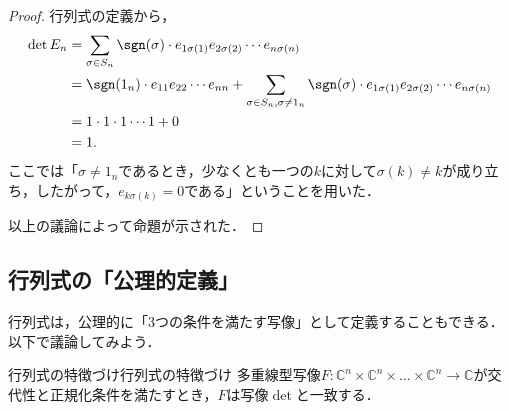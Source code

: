 \begin{tleftbar}
\begin{proof}
  行列式の定義から，
  \begin{align*} 
    \det E_n &= \sum_{\sigma \in S_n} \sgn(\sigma) \cdot e_{1\sigma(1)} e_{2\sigma(2)} \dotsm e_{n\sigma(n)} \\
    &= \sgn(1_n) \cdot e_{11} e_{22} \dotsm e_{nn} + \sum_{\sigma \in S_n, \sigma \ne 1_n} \sgn(\sigma) \cdot e_{1\sigma(1)} e_{2\sigma(2)} \dotsm e_{n\sigma(n)} \\
    &= 1 \cdot 1 \cdot 1 \dotsm 1 + 0 \\
    &= 1.
  \end{align*}
  ここでは「$\sigma \ne 1_n$であるとき，少なくとも一つの$k$に対して$\sigma(k) \ne k$が成り立ち，したがって，$e_{k\sigma(k)} = 0$である」ということを用いた．

  以上の議論によって命題が示された．
\end{proof}
\end{tleftbar}

\subsection{行列式の「公理的定義」}

行列式は，公理的に「3つの条件を満たす写像」として定義することもできる．以下で議論してみよう．

\begin{prop}{行列式の特徴づけ}{行列式の特徴づけ}
多重線型写像$F \colon \mathbb{C}^n \times \mathbb{C}^n \times \dots \times \mathbb{C}^n \to \mathbb{C}$が交代性と正規化条件を満たすとき，$F$は写像$\det$と一致する．
\end{prop}

